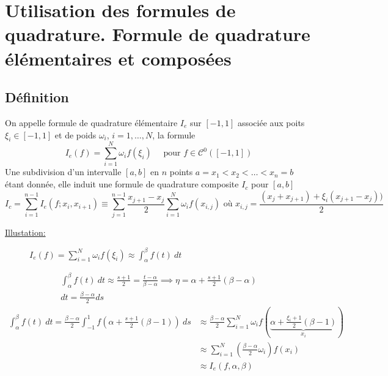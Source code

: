\section{Utilisation des formules de quadrature. Formule de quadrature élémentaires et composées}
\subsection{Définition}
On appelle formule de quadrature élémentaire $I_e$ sur  $[-1, 1]$ associée aux poits  $\xi_i \in [-1, 1]$ et de poids $\omega_i$,  $i = 1, \ldots, N$, la formule
\[
    I_e(f) = \sum_{i=1}^{N} \omega_if(\xi_i) \quad \text{ pour } f \in \mathcal{C}^0([-1, 1])
\] 
Une subdivision d'un intervalle $[a, b]$ en  $n$ points  $a = x_1 < x_2 < \ldots < x_n = b$ étant donnée, elle induit une formule de quadrature composite $I_c$ pour  $[a, b]$ 
\[
I_c = \sum_{i=1}^{n-1} I_e(f; x_i, x_{i+1}) \equiv \sum_{j=1}^{n-1} \frac{x_{j+1} - x_{j}}{2}\sum_{i=1}^{N} \omega_{i}f(x_{i,j}) \text{ où } x_{i, j} = \frac{(x_j + x_{j+1}) + \xi_{i}(x_{j+1} - x_j))}{2}
\] 

\underline{Illustation:}
\begin{figure}[H]
    \centering
    \caption{$I_e(f) = \sum_{i=1}^{N} \omega_if(\xi_i) \approx \int_{{\alpha}}^{{\beta}} {f(t)} \: d{t} {}$}
    \label{fig:illustration-de-l-integrale}
\end{figure}
\begin{align*}
    \int_{{\alpha}}^{{\beta}} {f(t)} \: d{t} \approx \frac{s+1}{2}=\frac{t-\alpha}{\beta - \alpha} \implies \eta = \alpha + \frac{s+1}{2}(\beta - \alpha)\\
    dt = \frac{\beta - \alpha}{2} ds
\end{align*}
\begin{align*}
    \int_{{\alpha}}^{{\beta}} {f(t)} \: d{t} = \frac{\beta - \alpha}{2} \int_{{-1}}^{{1}} {f(\alpha + \frac{s+1}{2}(\beta - 1))} \: d{s} &\approx \frac{\beta - \alpha}{2}\sum_{i=1}^{N} \omega_if(\underbrace{ \alpha + \frac{\xi_{i}+1}{2}(\beta - 1) }_{x_i})\\
                                                                                                                                         &\approx \sum_{i=1}^{N} \left( \frac{\beta - \alpha}{2}\omega_i \right) f(x_i)\\
                                                                                                                                         &\approx I_e(f, \alpha, \beta)
\end{align*}
